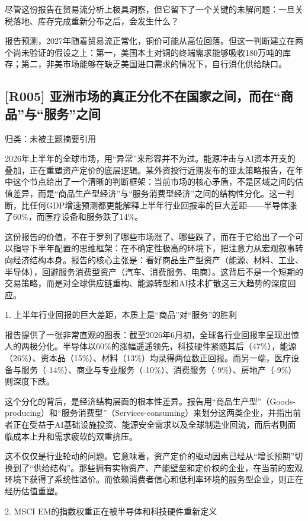 \documentclass[11pt]{ctexart}
\begin{document}
尽管这份报告在贸易流分析上极具洞察，但它留下了一个关键的未解问题：一旦关税落地、库存完成重新分布之后，会发生什么？

报告预测，2027年随着贸易流正常化，铜价可能从高位回落。但这一判断建立在两个尚未验证的假设之上：第一，美国本土对铜的终端需求能够吸收180万吨的库存；第二，非美市场能够在缺乏美国进口需求的情况下，自行消化供给缺口。

\subsection{[R005] 亚洲市场的真正分化不在国家之间，而在“商品”与“服务”之间}
{\small\color{refgray}归类：未被主题摘要引用}

2026年上半年的全球市场，用“异常”来形容并不为过。能源冲击与AI资本开支的叠加，正在重塑资产定价的底层逻辑。某外资投行近期发布的亚太策略报告，在年中这个节点给出了一个清晰的判断框架：当前市场的核心矛盾，不是区域之间的估值差异，而是“商品生产型经济”与“服务消费型经济”之间的结构性分化。这一判断，比任何GDP增速预测都更能解释上半年行业回报率的巨大差距——半导体涨了60\%，而医疗设备和服务跌了14\%。

这份报告的价值，不在于罗列了哪些市场涨了、哪些跌了，而在于它给出了一个可以指导下半年配置的思维框架：在不确定性极高的环境下，把注意力从宏观叙事转向经济结构本身。报告的核心主张是：看好商品生产型资产（能源、材料、工业、半导体），回避服务消费型资产（汽车、消费服务、电商）。这背后不是一个短期的交易策略，而是对全球供应链重构、能源转型和AI技术扩散这三大趋势的深度回应。

1. 上半年行业回报的巨大差距，本质上是“商品”对“服务”的胜利

报告提供了一张非常直观的图表：截至2026年6月初，全球各行业回报率呈现出惊人的两极分化。半导体以60\%的涨幅遥遥领先，科技硬件紧随其后（47\%），能源（26\%）、资本品（15\%）、材料（13\%）均录得两位数正回报。而另一端，医疗设备与服务（-14\%）、商业与专业服务（-10\%）、消费服务（-9\%）、房地产（-9\%）则深度下跌。

这个分化的背后，是经济结构层面的根本性差异。报告用“商品生产型”（Goods-producing）和“服务消费型”（Services-consuming）来划分这两类企业，并指出前者正在受益于AI基础设施投资、能源安全需求以及全球制造业回流，而后者则面临成本上升和需求疲软的双重挤压。

这不仅仅是行业轮动的问题。它意味着，资产定价的驱动因素已经从“增长预期”切换到了“供给结构”。那些拥有实物资产、产能壁垒和定价权的企业，在当前的宏观环境下获得了系统性溢价。而依赖消费者信心和低利率环境的服务型企业，则正在经历估值重塑。

2. MSCI EM的指数权重正在被半导体和科技硬件重新定义
\end{document}
